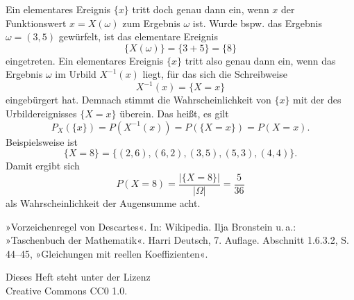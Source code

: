 \documentclass[a4paper,10pt,fleqn,twocolumn,twoside,dvipdfmx]{scrartcl}
\theoremstyle{rmbox}
\begin{document}
Ein elementares Ereignis $\{x\}$ tritt doch genau dann ein,
wenn $x$ der Funktionswert $x=X(\omega)$ zum Ergebnis
$\omega$ ist. Wurde bspw. das Ergebnis $\omega=(3, 5)$
gewürfelt, ist das elementare Ereignis%
\[\{X(\omega)\} = \{3 + 5\} = \{8\}\]
eingetreten.
Ein elementares Ereignis $\{x\}$ tritt also genau dann ein, wenn das
Ergebnis $\omega$ im Urbild $X^{-1}(x)$ liegt, für das sich die
Schreibweise%
\[X^{-1}(x)=\{X=x\}\]
eingebürgert hat. Demnach stimmt die Wahrscheinlichkeit von $\{x\}$
mit der des Urbildereignisses $\{X=x\}$ überein. Das heißt, es gilt%
\[P_X(\{x\}) = P(X^{-1}(x)) = P(\{X=x\}) = P(X=x).\]
Beispielsweise ist
\[\{X=8\} = \{(2,6), (6,2), (3,5), (5,3), (4,4)\}.\]
Damit ergibt sich
\[P(X=8) = \frac{|\{X=8\}|}{|\Omega|} = \frac{5}{36}\]
als Wahrscheinlichkeit der Augensumme acht.

\begin{thebibliography}{00}
 »Vorzeichenregel von Descartes«. In: Wikipedia.
 Ilja Bronstein u.\,a.: »Taschenbuch der Mathematik«.
Harri Deutsch, 7. Auflage. Abschnitt 1.6.3.2, S. 44--45, »Gleichungen mit
reellen Koeffizienten«.
\end{thebibliography}


\vfill\noindent
Dieses Heft steht unter der Lizenz\\
Creative Commons CC0 1.0.
\end{document}

